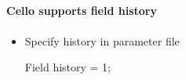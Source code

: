\NEWSEC
% 
%
  

\subsection{\ssRecentHistory}

\begin{frame}[fragile,label=ss-recent-history] 
  \secframetitle{\ssRecentHistory}
  \framesubtitle{Cello supports field history}
  \begin{itemize}
  \item Specify history in parameter file

  Field {
     history = 1;
  }
  \end{itemize}
%  
%
%
%
%
%
%
%

\end{frame}

